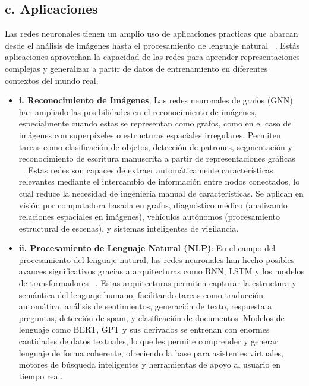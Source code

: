 \documentclass[11pt]{article} %
\begin{document}
\subsection{c. Aplicaciones} 
\vspace{3pt}
Las redes neuronales tienen un amplio uso de aplicaciones practicas que abarcan desde el análisis de imágenes hasta el procesamiento de lenguaje natural ~\cite{hui2021gnn}. Estás aplicaciones aprovechan la capacidad de las redes para aprender representaciones complejas y generalizar a partir de datos de entrenamiento en diferentes contextos del mundo real.
\begin{itemize}
\item \textbf{i. Reconocimiento de Imágenes}; \newline
Las redes neuronales de grafos (GNN) han ampliado las posibilidades en el reconocimiento de imágenes, especialmente cuando estas se representan como grafos, como en el caso de imágenes con superpíxeles o estructuras espaciales irregulares. Permiten tareas como clasificación de objetos, detección de patrones, segmentación y reconocimiento de escritura manuscrita a partir de representaciones gráficas ~\cite{hui2021gnn}. Estas redes son capaces de extraer automáticamente características relevantes mediante el intercambio de información entre nodos conectados, lo cual reduce la necesidad de ingeniería manual de características. Se aplican en visión por computadora basada en grafos, diagnóstico médico (analizando relaciones espaciales en imágenes), vehículos autónomos (procesamiento estructural de escenas), y sistemas inteligentes de vigilancia.


    \item \textbf{ii. Procesamiento de Lenguaje Natural (NLP)}: \newline
    En el campo del procesamiento del lenguaje natural, las redes neuronales han hecho posibles avances significativos gracias a arquitecturas como RNN, LSTM y los modelos de transformadores ~\cite{aws2025nlp}. Estas arquitecturas permiten capturar la estructura y semántica del lenguaje humano, facilitando tareas como traducción automática, análisis de sentimientos, generación de texto, respuesta a preguntas, detección de spam, y clasificación de documentos. Modelos de lenguaje como BERT, GPT y sus derivados se entrenan con enormes cantidades de datos textuales, lo que les permite comprender y generar lenguaje de forma coherente, ofreciendo la base para asistentes virtuales, motores de búsqueda inteligentes y herramientas de apoyo al usuario en tiempo real.

\end{itemize}
\end{document}
